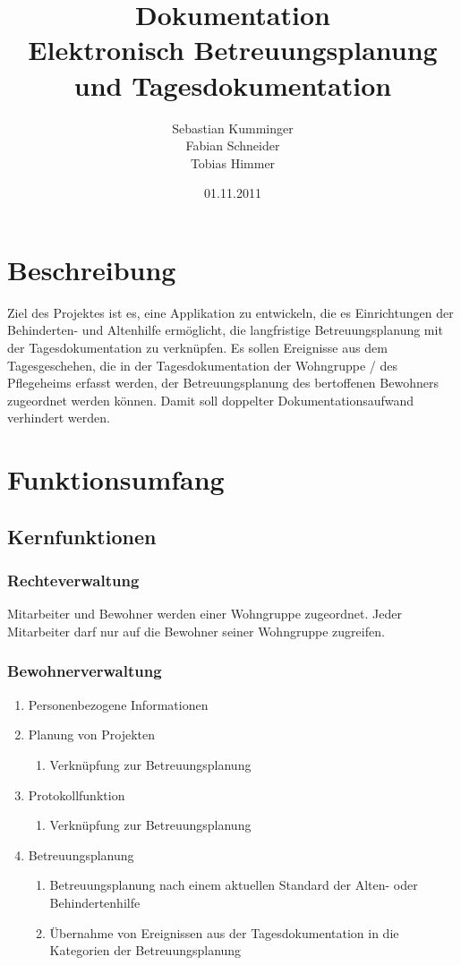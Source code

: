 \documentclass[a4paper,10pt]{article}
\author{Sebastian Kumminger\\
	Fabian Schneider\\
	Tobias Himmer}
\title{Dokumentation\\
	Elektronisch Betreuungsplanung und Tagesdokumentation}
\date{01.11.2011}
\begin{document}
\maketitle

\section{Beschreibung}
Ziel des Projektes ist es, eine Applikation zu entwickeln, die es Einrichtungen der Behinderten- und Altenhilfe ermöglicht, die langfristige Betreuungsplanung mit der Tagesdokumentation zu verknüpfen. Es sollen Ereignisse aus dem Tagesgeschehen, die in der Tagesdokumentation der Wohngruppe / des Pflegeheims erfasst werden, der Betreuungsplanung des bertoffenen Bewohners zugeordnet werden können. Damit soll doppelter Dokumentationsaufwand verhindert werden.

\section{Funktionsumfang}

\subsection{Kernfunktionen}

\subsubsection{Rechteverwaltung}
Mitarbeiter und Bewohner werden einer Wohngruppe zugeordnet. Jeder Mitarbeiter darf nur auf die Bewohner seiner Wohngruppe zugreifen.

\subsubsection{Bewohnerverwaltung}
\begin{enumerate}
	\item Personenbezogene Informationen
	\item Planung von Projekten
	\begin{enumerate}
		\item Verknüpfung zur Betreuungsplanung
	\end{enumerate}
	\item Protokollfunktion
	\begin{enumerate}
		\item Verknüpfung zur Betreuungsplanung
	\end{enumerate}
	\item  Betreuungsplanung
	\begin{enumerate}
		\item Betreuungsplanung nach einem aktuellen Standard der Alten- oder Behindertenhilfe
		\item Übernahme von Ereignissen aus der Tagesdokumentation in die Kategorien der Betreuungsplanung
	\end{enumerate}
\end{enumerate}
\end{document}
